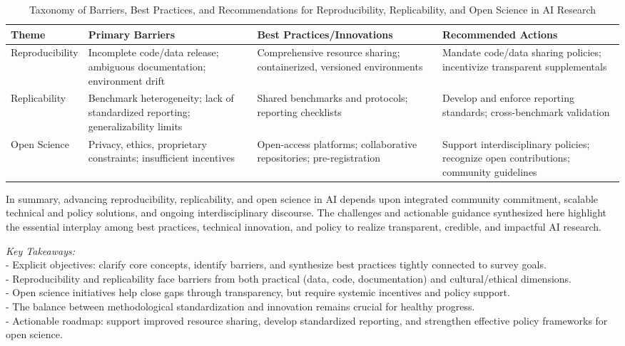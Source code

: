 \documentclass[sigconf]{acmart}
\begin{document}
\begin{table*}[htbp]
\centering
\caption{Taxonomy of Barriers, Best Practices, and Recommendations for Reproducibility, Replicability, and Open Science in AI Research}
\label{tab:reprod_taxonomy}
\begin{adjustbox}{max width=\textwidth}
\begin{tabular}{@{}llll@{}}
\toprule
\textbf{Theme} & \textbf{Primary Barriers} & \textbf{Best Practices/Innovations} & \textbf{Recommended Actions} \\
\midrule
Reproducibility & Incomplete code/data release; ambiguous documentation; environment drift & Comprehensive resource sharing; containerized, versioned environments & Mandate code/data sharing policies; incentivize transparent supplementals \\
Replicability & Benchmark heterogeneity; lack of standardized reporting; generalizability limits & Shared benchmarks and protocols; reporting checklists & Develop and enforce reporting standards; cross-benchmark validation \\
Open Science & Privacy, ethics, proprietary constraints; insufficient incentives & Open-access platforms; collaborative repositories; pre-registration & Support interdisciplinary policies; recognize open contributions; community guidelines \\
\bottomrule
\end{tabular}
\end{adjustbox}
\end{table*}

\noindent
In summary, advancing reproducibility, replicability, and open science in AI depends upon integrated community commitment, scalable technical and policy solutions, and ongoing interdisciplinary discourse. The challenges and actionable guidance synthesized here highlight the essential interplay among best practices, technical innovation, and policy to realize transparent, credible, and impactful AI research.

\begin{flushright}
\textit{Key Takeaways:} \\
- Explicit objectives: clarify core concepts, identify barriers, and synthesize best practices tightly connected to survey goals.\\
- Reproducibility and replicability face barriers from both practical (data, code, documentation) and cultural/ethical dimensions. \\
- Open science initiatives help close gaps through transparency, but require systemic incentives and policy support. \\
- The balance between methodological standardization and innovation remains crucial for healthy progress. \\
- Actionable roadmap: support improved resource sharing, develop standardized reporting, and strengthen effective policy frameworks for open science.
\end{flushright}
\end{document}

